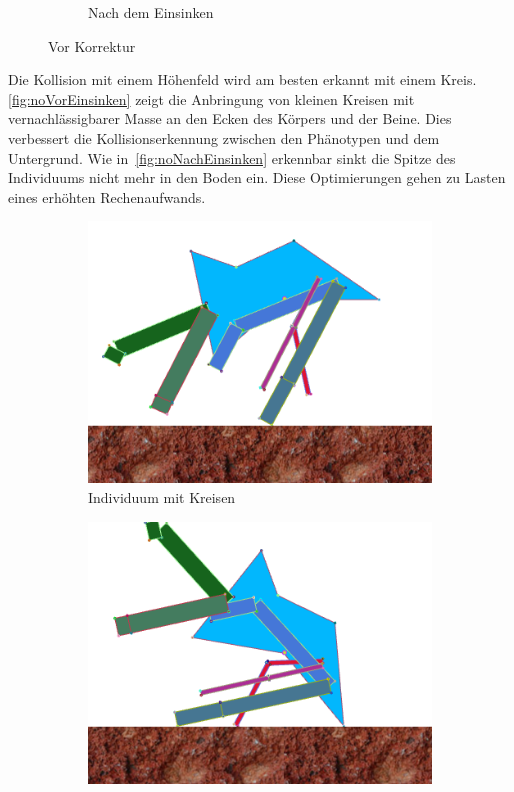 \begin{figure}[H]
\begin{subfigure}[b]{0.45\textwidth}
            \caption{Nach dem Einsinken\label{fig:nachEinsinken}}
          \end{subfigure}
          \caption{Vor Korrektur}
        \end{figure}

        Die Kollision mit einem Höhenfeld wird am besten erkannt mit einem Kreis.
        \vref{fig:noVorEinsinken} zeigt die Anbringung von kleinen Kreisen mit vernachlässigbarer Masse an den Ecken des Körpers und der Beine.
        Dies verbessert die Kollisionserkennung zwischen den Phänotypen und dem Untergrund.
        Wie in~\vref{fig:noNachEinsinken} erkennbar sinkt die Spitze des Individuums nicht mehr in den Boden ein.
        Diese Optimierungen gehen zu Lasten eines erhöhten Rechenaufwands.

        \begin{figure}[H]
          \centering
          \begin{subfigure}[b]{0.45\textwidth}
            \includegraphics[width=\linewidth,center]{graphics/physics-engine/sink-fix-0}
            \caption{Individuum mit Kreisen\label{fig:noVorEinsinken}}
          \end{subfigure}
          \qquad
          \begin{subfigure}[b]{0.45\textwidth}
            \includegraphics[width=\linewidth,center]{graphics/physics-engine/sink-fix-1}

\end{subfigure}
\end{figure}
